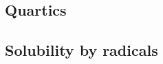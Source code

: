 \documentclass{article}
\begin{document}
{
}





























\subsection{Quartics}































































\subsection{Solubility by radicals}
\end{document}
